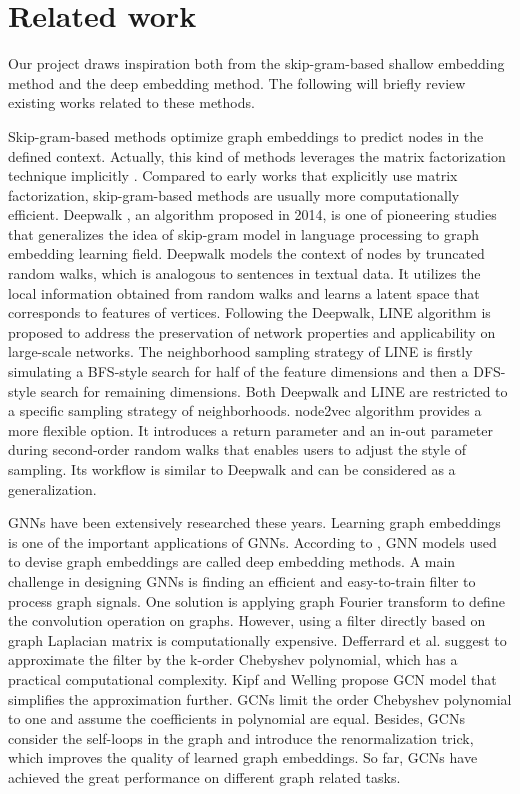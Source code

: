 \documentclass[sigconf]{acmart}
\begin{document}
\section{Related work}
Our project draws inspiration both from the skip-gram-based shallow embedding method and the deep embedding method. The following will briefly review existing works related to these methods.\par

Skip-gram-based methods optimize graph embeddings to predict nodes in the defined context. Actually, this kind of methods leverages the matrix factorization technique implicitly \cite{murphy2022}. Compared to early works that explicitly use matrix factorization, skip-gram-based methods are usually more computationally efficient. Deepwalk \cite{deepwalk}, an algorithm proposed in 2014, is one of pioneering studies that generalizes the idea of skip-gram model in language processing to graph embedding learning field. Deepwalk models the context of nodes by truncated random walks, which is analogous to sentences in textual data. It utilizes the local information obtained from random walks and learns a latent space that corresponds to features of vertices. Following the Deepwalk, LINE algorithm \cite{line} is proposed to address the preservation of network properties and applicability on large-scale networks. The neighborhood sampling strategy of LINE is firstly simulating a BFS-style search for half of the feature dimensions and then a DFS-style search for remaining dimensions. Both Deepwalk and LINE are restricted to a specific sampling strategy of neighborhoods. node2vec \cite{node2vec} algorithm provides a more flexible option. It introduces a return parameter and an in-out parameter during second-order random walks that enables users to adjust the style of sampling. Its workflow is similar to Deepwalk and can be considered as a generalization.\par

GNNs have been extensively researched these years. Learning graph embeddings is one of the important applications of GNNs. According to \cite{murphy2022}, GNN models used to devise graph embeddings are called deep embedding methods. A main challenge in designing GNNs is finding an efficient and easy-to-train filter to process graph signals. One solution is applying graph Fourier transform to define the convolution operation on graphs. However, using a filter directly based on graph Laplacian matrix is computationally expensive. Defferrard et al. \cite{Defferrard2016} suggest to approximate the filter by the k-order Chebyshev polynomial, which has a practical computational complexity. Kipf and Welling \cite{gcn} propose GCN model that simplifies the approximation further. GCNs limit the order Chebyshev polynomial to one and assume the coefficients in polynomial are equal. Besides, GCNs consider the self-loops in the graph and introduce the renormalization trick, which improves the quality of learned graph embeddings. So far, GCNs have achieved the great performance on different graph related tasks.\par
\end{document}
